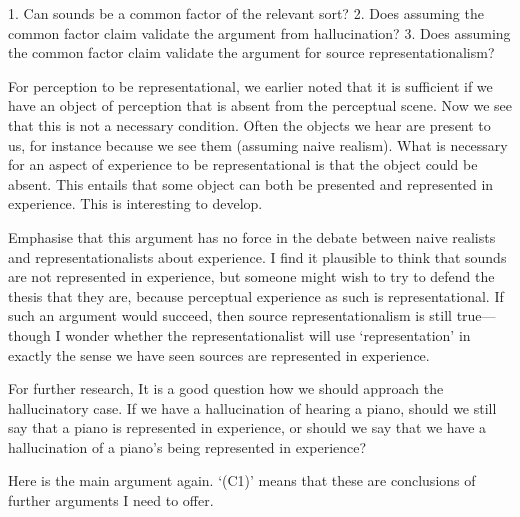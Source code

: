 \documentclass[sloppy, journal, git, bytitle, dodraft]{humapap}
\begin{document}
1. Can sounds be a common factor of the relevant sort?
2. Does assuming the common factor claim validate the argument from hallucination? 
3. Does assuming the common factor claim validate the argument for source representationalism? 


\sect

For perception to be representational, we earlier noted that it is sufficient if we have an object of perception that is absent from the perceptual scene. Now we see that this is not a necessary condition. Often the objects we hear are present to us, for instance because we see them (assuming naive realism). What is necessary for an aspect of experience to be representational is that the object could be absent. This entails that some object can both be presented and represented in experience. This is interesting to develop.

Emphasise that this argument has no force in the debate between naive realists and representationalists about experience. I find it plausible to think that sounds are not represented in experience, but someone might wish to try to defend the thesis that they are, because perceptual experience as such is representational. If such an argument would succeed, then source representationalism is still true---though I wonder whether the representationalist will use `representation' in exactly the sense we have seen sources are represented in experience. 

For further research, It is a good question how we should approach the hallucinatory case. If we have a hallucination of hearing a piano, should we still say that a piano is represented in experience, or should we say that we have a hallucination of a piano's being represented in experience? 


Here is the main argument again. `(C1)' means that these are conclusions of further arguments I need to offer.
\end{document}
